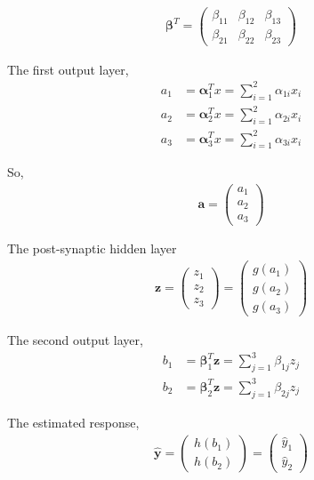 \documentclass[12pt,a4paper]{article}%
\theoremstyle{definition}
\theoremstyle{plain}
\numberwithin{equation}{section}
\begin{document}
\begin{gather}
\boldsymbol{\beta}^{T} = \begin{pmatrix}
  \beta_{11} & \beta_{12} & \beta_{13} \\
  \beta_{21} & \beta_{22} & \beta_{23}
 \end{pmatrix}
\end{gather}

The first output layer,
\begin{align*}
a_{1} &= \boldsymbol{\alpha}_{1}^{T} x = \sum\limits_{i=1}^{2} \alpha_{1i}x_{i}  \\
a_{2} &= \boldsymbol{\alpha}_{2}^{T} x = \sum\limits_{i=1}^{2} \alpha_{2i}x_{i} \\
a_{3} &= \boldsymbol{\alpha}_{3}^{T} x = \sum\limits_{i=1}^{2} \alpha_{3i}x_{i}
\end{align*}

So, 
\begin{gather}
\mathbf{a} = \begin{pmatrix}
  a_{1} \\
  a_{2} \\
  a_{3}
 \end{pmatrix}
\end{gather}

The post-synaptic hidden layer
\begin{gather}
\mathbf{z} = \begin{pmatrix}
  z_{1} \\
  z_{2} \\
  z_{3}
 \end{pmatrix} = \begin{pmatrix}
  g(a_{1}) \\
  g(a_{2}) \\
  g(a_{3})
 \end{pmatrix}
\end{gather}

The second output layer,
\begin{align*}
b_{1} &= \boldsymbol{\beta}_{1}^{T} \mathbf{z} = \sum\limits_{j=1}^{3} \beta_{1j}z_{j}  \\
b_{2} &= \boldsymbol{\beta}_{2}^{T} \mathbf{z} = \sum\limits_{j=1}^{3} \beta_{2j}z_{j}
\end{align*}

The estimated response,
\begin{gather*}
\mathbf{\hat{y}} = \begin{pmatrix}
  h(b_{1}) \\
  h(b_{2})
 \end{pmatrix} = \begin{pmatrix}
  \hat{y}_{1} \\
  \hat{y}_{2}
 \end{pmatrix}
\end{gather*}
\end{document}
